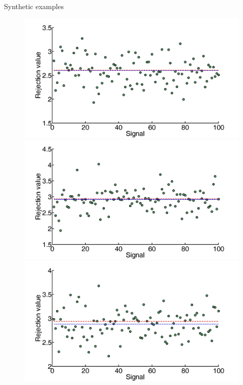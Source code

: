 \documentclass[8pt]{beamer}
\begin{document}
\begin{frame}{Synthetic examples}
\begin{figure}[H]
\includegraphics[scale=0.07]{randSignalRejectionDistribution} %
\includegraphics[scale=0.07]{sineSignalRejectionDistribution} %
\includegraphics[scale=0.07]{gaussianChainSignalRejectionDistribution} %

\end{figure}

\end{frame}
\end{document}
